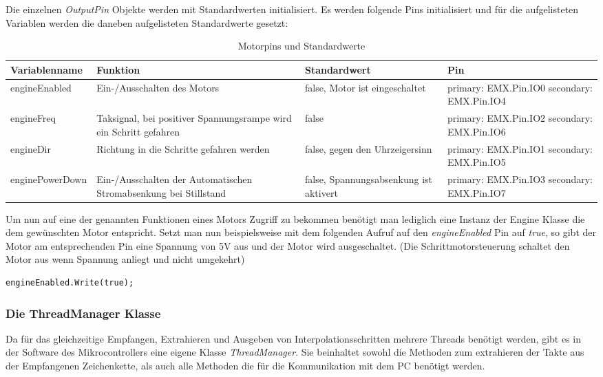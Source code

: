 Die einzelnen \textit{OutputPin} Objekte werden mit Standardwerten initialisiert. Es werden folgende Pins initialisiert und für die aufgelisteten Variablen werden die daneben aufgelisteten Standardwerte gesetzt:

\begin{table}[h]
\begin{tabular}{|p{3cm}|p{3.5cm}|p{3.5cm}|p{3.5cm}|}
\hline \rowcolor{lightgray}
\textbf{Variablenname} & \textbf{Funktion} & \textbf{Standardwert} &\textbf{Pin}\\
\hline
engineEnabled & Ein-/Ausschalten des Motors & false, Motor ist eingeschaltet & primary: EMX.Pin.IO0 secondary: EMX.Pin.IO4\\
\hline
engineFreq & Taksignal, bei positiver Spannungsrampe wird ein Schritt gefahren & false & primary: EMX.Pin.IO2 secondary: EMX.Pin.IO6\\
\hline
engineDir & Richtung in die Schritte gefahren werden & false, gegen den Uhrzeigersinn & primary: EMX.Pin.IO1 secondary: EMX.Pin.IO5\\
\hline
enginePowerDown & Ein-/Ausschalten der Automatischen Stromabsenkung bei Stillstand & false, Spannungsabsenkung ist aktivert & primary: EMX.Pin.IO3 secondary: EMX.Pin.IO7\\
\hline
\end{tabular}
\caption{Motorpins und Standardwerte}
\end{table}

Um nun auf eine der genannten Funktionen eines Motors Zugriff zu bekommen benötigt man lediglich eine Instanz der Engine Klasse die dem gewünschten Motor entspricht. Setzt man nun beispielsweise mit dem folgenden Aufruf auf den \textit{engineEnabled} Pin auf \textit{true}, so gibt der Motor am entsprechenden Pin eine Spannung von 5V aus und der Motor wird ausgeschaltet. (Die Schrittmotorsteuerung schaltet den Motor aus wenn Spannung anliegt und nicht umgekehrt)
\begin{lstlisting}[language = CSharp, captionpos=b, caption={Das Setzen eines OutputPins}]
engineEnabled.Write(true);
\end{lstlisting}
 
\subsubsection{Die ThreadManager Klasse}
Da für das gleichzeitige Empfangen, Extrahieren und Ausgeben von Interpolationsschritten mehrere Threads benötigt werden, gibt es in der Software des Mikrocontrollers eine eigene Klasse \textit{ThreadManager}. Sie beinhaltet sowohl die Methoden zum extrahieren der Takte aus der Empfangenen Zeichenkette, als auch alle Methoden die für die Kommunikation mit dem PC benötigt werden.

